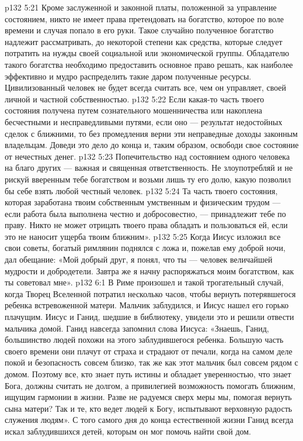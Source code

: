 \vs p132 5:21 \pc {}\bibnobreakspace Кроме заслуженной и законной платы, положенной за управление состоянием, никто не имеет права претендовать на богатство, которое по воле времени и случая попало в его руки. Такое случайно полученное богатство надлежит рассматривать, до некоторой степени как средства, которые следует потратить на нужды своей социальной или экономической группы. Обладателю такого богатства необходимо предоставить основное право решать, как наиболее эффективно и мудро распределить такие даром полученные ресурсы. Цивилизованный человек не будет всегда считать все, чем он управляет, своей личной и частной собственностью.
\vs p132 5:22 \pc {}\bibnobreakspace Если какая\hyp{}то часть твоего состояния получена путем сознательного мошенничества или накоплена бесчестными и несправедливыми путями, если оно --- результат недостойных сделок с ближними, то без промедления верни эти неправедные доходы законным владельцам. Доведи это дело до конца и, таким образом, освободи свое состояние от нечестных денег.
\vs p132 5:23 \pc {}\bibnobreakspace Попечительство над состоянием одного человека на благо других --- важная и священная ответственность. Не злоупотребляй и не рискуй вверенным тебе богатством и возьми лишь ту его долю, какую позволил бы себе взять любой честный человек.
\vs p132 5:24 \pc {}\bibnobreakspace Та часть твоего состояния, которая заработана твоим собственным умственным и физическим трудом --- если работа была выполнена честно и добросовестно, --- принадлежит тебе по праву. Никто не может отрицать твоего права обладать и пользоваться ей, если это не наносит ущерба твоим ближним».
\vs p132 5:25 \pc Когда Иисус изложил все свои советы, богатый римлянин поднялся с ложа и, пожелав ему доброй ночи, дал обещание: «Мой добрый друг, я понял, что ты --- человек величайшей мудрости и добродетели. Завтра же я начну распоряжаться моим богатством, как ты советовал мне».
\vs p132 6:1 В Риме произошел и такой трогательный случай, когда Творец Вселенной потратил несколько часов, чтобы вернуть потерявшегося ребенка встревоженной матери. Мальчик заблудился, и Иисус нашел его горько плачущим. Иисус и Ганид, шедшие в библиотеку, увидели это и решили отвести мальчика домой. Ганид навсегда запомнил слова Иисуса: «Знаешь, Ганид, большинство людей похожи на этого заблудившегося ребенка. Большую часть своего времени они плачут от страха и страдают от печали, когда на самом деле покой и безопасность совсем близко, так же как этот мальчик был совсем рядом с домом. Поэтому все, кто знает путь истины и обладает уверенностью, что знает Бога, должны считать не долгом, а привилегией возможность помогать ближним, ищущим гармонии в жизни. Разве не радуемся сверх меры мы, помогая вернуть сына матери? Так и те, кто ведет людей к Богу, испытывают верховную радость служения людям». С того самого дня до конца естественной жизни Ганид всегда искал заблудившихся детей, которым он мог помочь найти свой дом.
